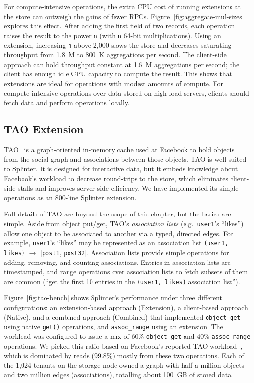 For compute-intensive operations, the extra CPU cost of
running extensions at the store can outweigh the gains of fewer RPCs.
Figure~\ref{fig:aggregate-mul-sizes} explores this effect.
After adding the first field of two records, each operation raises the
  result to the power \texttt{n} (with \texttt{n} 64-bit
  multiplications).
Using an extension, increasing \texttt{n} above 2,000
  slows the store and decreases
  saturating throughput from 1.8~M to 800~K aggregations per second.
The client-side approach can hold throughput constant
  at 1.6~M aggregations per second;
the client has enough idle CPU capacity to compute the result.
This shows that extensions are ideal for operations with
  modest amounts of compute.
For compute-intensive operations over data stored on high-load servers,
  clients should fetch data and perform operations locally.

\subsection{TAO Extension}

TAO~\cite{tao-2013} is a graph-oriented in-memory cache used at Facebook to hold
  objects from the social graph and associations between those objects.
TAO is well-suited to Splinter.
It is designed for interactive data, but it embeds knowledge
  about Facebook's workload to decrease round-trips to the store, which
  eliminates client-side stalls and improves server-side efficiency.
We have implemented its simple operations as an 800-line Splinter extension.

Full details of TAO are beyond the scope of this chapter, but the basics are
  simple. Aside from object put/get, TAO's \textsl{association lists} (e.g.\
  \texttt{user1}'s ``likes'') allow one object to be
  associated to another via a typed, directed edges.
For example, \texttt{user1}'s ``likes'' may be represented as an association list
  \texttt{(user1, likes)} $\rightarrow$ [\texttt{post1}, \texttt{post32}].
Association lists provide simple operations for adding, removing, and counting
  associations. Entries in association lists are timestamped, and range operations
  over association lists to fetch subsets of them are common (``get the first 10 entries in
  the \texttt{(user1, likes)} association list'').

Figure~\ref{fig:tao-bench} shows Splinter's performance under three
different configurations: an extension-based approach (Extension), a
client-based approach (Native), and a combined approach (Combined) that implemented
\texttt{object\_get} using native \texttt{get()} operations, and
\texttt{assoc\_range} using an extension.
The workload was configured to
issue a mix of 60\%
  \texttt{object\_get} and 40\% \texttt{assoc\_range} operations.
We picked this ratio based on Facebook's reported TAO workload~\cite{tao-2013},
  which is dominated by reads (99.8\%) mostly from these two operations.
Each of the 1,024 tenants on the storage node owned a graph with half a million
  objects and two million edges (associations), totalling about 100~GB of
  stored data.

